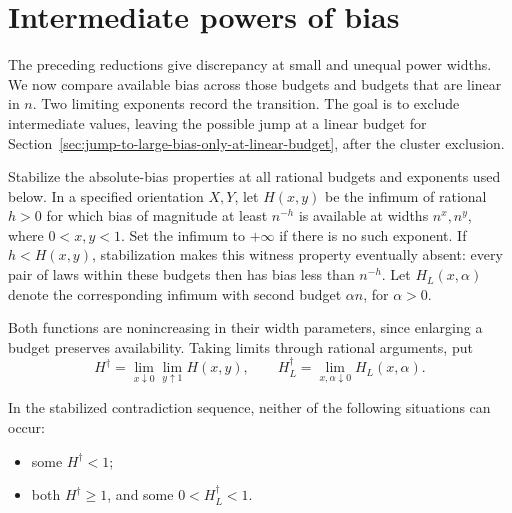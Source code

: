 \section{Intermediate powers of bias}
\label{sec:intermediate-powers-of-bias}

The preceding reductions give discrepancy at small and unequal power
widths. We now compare available bias across those budgets and budgets that
are linear in \(n\). Two limiting exponents record the transition. The goal
is to exclude intermediate values, leaving the possible jump at a linear
budget for Section~\ref{sec:jump-to-large-bias-only-at-linear-budget}, after
the cluster exclusion.

\begin{definition}\label{def:limiting-bias-exponents}
Stabilize the absolute-bias properties at all rational budgets and exponents used below. In a specified orientation \(X,Y\), let \(H(x,y)\) be the infimum of rational \(h>0\) for which bias of magnitude at least \(n^{-h}\) is available at widths \(n^x,n^y\), where \(0<x,y<1\). Set the infimum to \(+\infty\) if there is no such exponent. If \(h<H(x,y)\), stabilization makes this witness property eventually absent: every pair of laws within these budgets then has bias less than \(n^{-h}\). Let \(H_L(x,\alpha)\) denote the corresponding infimum with second budget \(\alpha n\), for \(\alpha>0\).

Both functions are nonincreasing in their width parameters, since enlarging a budget preserves availability. Taking limits through rational arguments, put
\[
 H^\dagger=\lim_{x\downarrow0}\lim_{y\uparrow1}H(x,y),\qquad
 H_L^\dagger=\lim_{x,\alpha\downarrow0}H_L(x,\alpha).
\]

\end{definition}

\begin{proposition}\label{prop:intermediate-bias-exclusion}
In the stabilized contradiction sequence, neither of the following situations can occur:
\begin{itemize}
\item some \(H^\dagger<1\);
\item both \(H^\dagger\ge1\), and some \(0<H_L^\dagger<1\).
\end{itemize}
\end{proposition}

